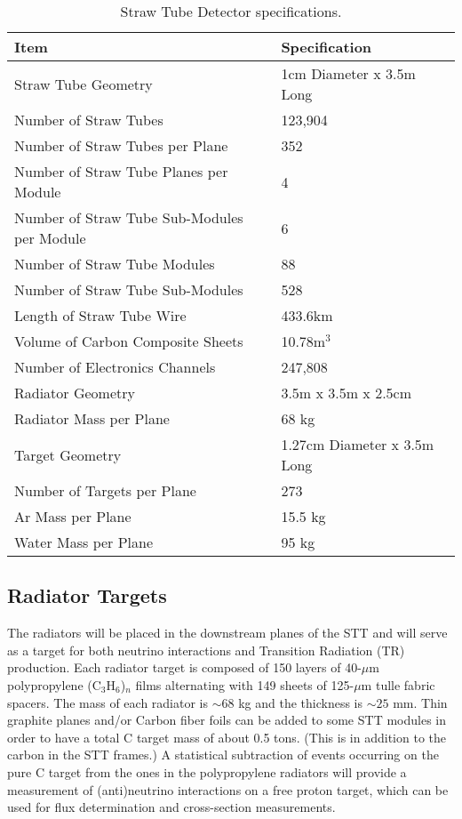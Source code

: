 \begin{table}
\centering
  \caption{\label{STT_details} Straw Tube Detector specifications.}
  \begin{tabular}{| l | l |}
    \hline
Item&Specification \\
    \hline
Straw Tube Geometry & 1cm Diameter x 3.5m Long \\
Number of Straw Tubes & 123,904 \\
Number of Straw Tubes per Plane & 352 \\
Number of Straw Tube Planes per Module & 4 \\
Number of Straw Tube Sub-Modules per Module & 6 \\
Number of Straw Tube Modules & 88 \\
Number of Straw Tube Sub-Modules & 528 \\
Length of Straw Tube Wire & 433.6km \\
Volume of Carbon Composite Sheets & 10.78m$^3$ \\
Number of Electronics Channels & 247,808 \\
Radiator Geometry & 3.5m x 3.5m x 2.5cm \\
Radiator Mass per Plane & 68 kg \\
Target Geometry & 1.27cm Diameter x 3.5m Long \\
Number of Targets per Plane & 273 \\
Ar Mass per Plane & 15.5 kg \\
Water Mass per Plane & 95 kg \\
     \hline
  \end{tabular}
\end{table}

\subsection{Radiator Targets}

The radiators will be placed in the downstream planes of the STT
and will serve as a target for both neutrino interactions 
and Transition Radiation (TR) production. Each radiator target is composed of 
150 layers of 40-$\mu$m polypropylene (C$_3$H$_6$)$_n$ 
films alternating with 149 sheets of 125-$\mu$m tulle fabric spacers. 
The mass of each radiator is $\sim 68$ kg and the thickness is 
$\sim 25$ mm. %
Thin graphite planes and/or Carbon fiber foils can be added to some STT modules
in order to have a total C target mass of about 0.5 tons. (This is in addition to
the carbon in the STT frames.) A statistical subtraction of events occurring
on the pure C target from the ones in the polypropylene radiators will provide a measurement of
(anti)neutrino interactions on a free proton target, which can be used for flux determination and cross-section
measurements.

